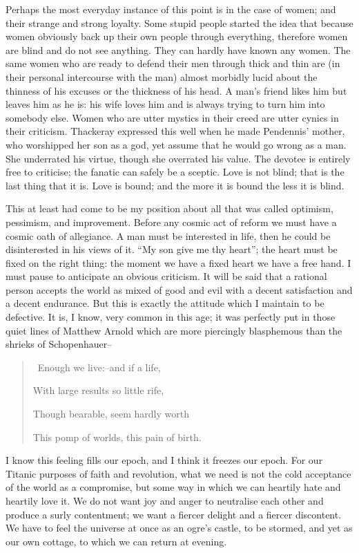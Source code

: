 \documentclass{book}
\begin{document}
Perhaps the most everyday instance of this point is in the case of women; and their strange and strong loyalty. Some stupid people started the idea that because women obviously back up their own people through everything, therefore women are blind and do not see anything. They can hardly have known any women. The same women who are ready to defend their men through thick and thin are (in their personal intercourse with the man) almost morbidly lucid about the thinness of his excuses or the thickness of his head. A man’s friend likes him but leaves him as he is: his wife loves him and is always trying to turn him into somebody else. Women who are utter mystics in their creed are utter cynics in their criticism. Thackeray expressed this well when he made Pendennis’ mother, who worshipped her son as a god, yet assume that he would go wrong as a man. She underrated his virtue, though she overrated his value. The devotee is entirely free to criticise; the fanatic can safely be a sceptic. Love is not blind; that is the last thing that it is. Love is bound; and the more it is bound the less it is blind.

This at least had come to be my position about all that was called optimism, pessimism, and improvement. Before any cosmic act of reform we must have a cosmic oath of allegiance. A man must be interested in life, then he could be disinterested in his views of it. “My son give me thy heart”; the heart must be fixed on the right thing: the moment we have a fixed heart we have a free hand. I must pause to anticipate an obvious criticism. It will be said that a rational person accepts the world as mixed of good and evil with a decent satisfaction and a decent endurance. But this is exactly the attitude which I maintain to be defective. It is, I know, very common in this age; it was perfectly put in those quiet lines of Matthew Arnold which are more piercingly blasphemous than the shrieks of Schopenhauer–

\begin{quotation}\
	Enough we live:–and if a life,

	With large results so little rife,

	Though bearable, seem hardly worth

	This pomp of worlds, this pain of birth.
\end{quotation}

I know this feeling fills our epoch, and I think it freezes our epoch. For our Titanic purposes of faith and revolution, what we need is not the cold acceptance of the world as a compromise, but some way in which we can heartily hate and heartily love it. We do not want joy and anger to neutralise each other and produce a surly contentment; we want a fiercer delight and a fiercer discontent. We have to feel the universe at once as an ogre’s castle, to be stormed, and yet as our own cottage, to which we can return at evening.
\end{document}
